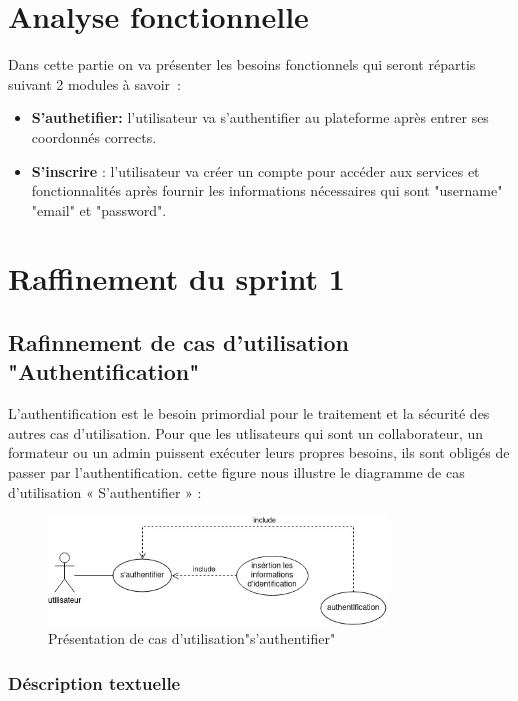 \section{Analyse fonctionnelle}
Dans cette partie on va présenter les besoins fonctionnels qui seront répartis suivant 2 modules à savoir :



\begin{itemize}
    \item \textbf{S'authetifier:} l'utilisateur va s'authentifier au plateforme après entrer ses coordonnés corrects.

    \item \textbf{S'inscrire}  : l'utilisateur va créer un compte pour accéder aux services et fonctionnalités après fournir les informations nécessaires qui sont "username" "email" et "password".


    

   
\end{itemize}
\section{Raffinement du sprint 1}
\subsection{Rafinnement de cas d'utilisation "Authentification"}
L’authentification est le besoin primordial pour le traitement et la sécurité des autres cas d’utilisation.
Pour que les utlisateurs qui sont un collaborateur, un formateur ou un admin  puissent exécuter leurs propres besoins, ils sont obligés de passer par l’authentification.
cette figure nous illustre le diagramme de cas d’utilisation « S’authentifier » :


\begin{figure}[!h]
\center
\includegraphics[width=0.8\textwidth]{pages/image/asma-usecase-authenthification.jpg}
\caption{Présentation de cas d'utilisation"s'authentifier"}
\end{figure}


\subsubsection{Déscription textuelle}  

